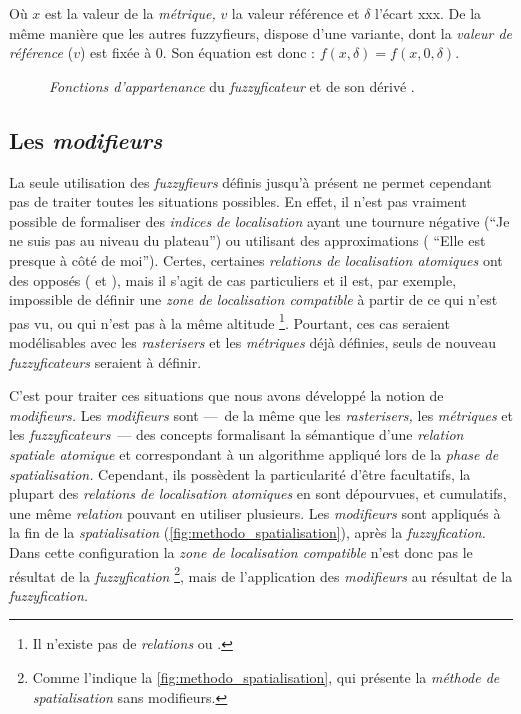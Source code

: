 Où \(x\) est la valeur de la \emph{métrique,} \(v\) la valeur
référence et \(\delta\) l'écart xxx. De la même manière que les autres
\textrm{fuzzyfieurs,}  dispose d'une variante,
 dont la \emph{valeur de référence} (\(v\)) est
fixée à 0. Son équation est donc : \(f(x,\delta) = f(x,0,\delta)\).

\begin{figure}
  \centering
  \hfill
  \caption{\emph{Fonctions d'appartenance} du \emph{fuzzyficateur}
    \protect{} et de son dérivé
    \protect{}.}
  \label{fig:select_infval}
\end{figure}


\subsection{Les \emph{modifieurs}}

La seule utilisation des \emph{fuzzyfieurs} définis jusqu'à présent ne
permet cependant pas de traiter toutes les situations possibles. En
effet, il n'est pas vraiment possible de formaliser des \emph{indices
  de localisation} ayant une tournure négative (\eg \enquote{Je ne
  suis pas au niveau du plateau}) ou utilisant des approximations (\eg
\enquote{Elle est presque à côté de moi}). Certes, certaines
\emph{relations de localisation atomiques} ont des opposés (\eg
{} et ), mais il s'agit de
cas particuliers et il est, par exemple, impossible de définir une
\emph{zone de localisation compatible} à partir de ce qui n'est pas
vu, ou qui n'est pas à la même altitude \footnote{Il n'existe pas de
  \emph{relations}  ou
  .}. Pourtant, ces cas
seraient modélisables avec les \emph{rasterisers} et les
\emph{métriques} déjà définies, seuls de nouveau \emph{fuzzyficateurs}
seraient à définir.

C'est pour traiter ces situations que nous avons développé la notion
de \emph{modifieurs.} Les \emph{modifieurs} sont ---~de la même que
les \emph{rasterisers,} les \emph{métriques} et les
\emph{fuzzyficateurs}~--- des concepts formalisant la sémantique d'une
\emph{relation spatiale atomique} et correspondant à un algorithme
appliqué lors de la \emph{phase de spatialisation.} Cependant, ils
possèdent la particularité d'être facultatifs, la plupart des
\emph{relations de localisation atomiques} en sont dépourvues, et
cumulatifs, une même \emph{relation} pouvant en utiliser
plusieurs. Les \emph{modifieurs} sont appliqués à la fin de la
\emph{spatialisation} (\autoref{fig:methodo_spatialisation}), après la
\emph{fuzzyfication.}  Dans cette configuration la \emph{zone de
  localisation compatible} n'est donc pas le résultat de la
\emph{fuzzyfication} \footnote{Comme l'indique la
  \autoref{fig:methodo_spatialisation}, qui présente la \emph{méthode
    de spatialisation} sans modifieurs.}, mais de l’application des
\emph{modifieurs} au résultat de la \emph{fuzzyfication.}

